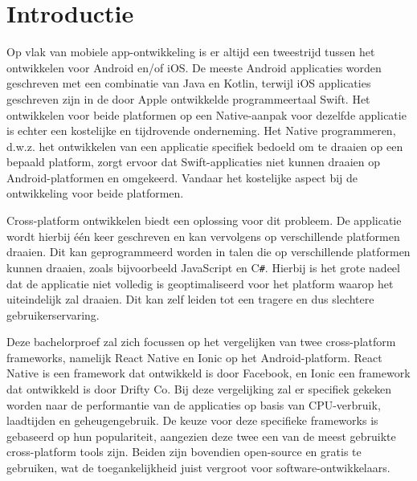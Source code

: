 
\section{Introductie}%
\label{sec:introductie}

Op vlak van mobiele app-ontwikkeling is er altijd een tweestrijd tussen het ontwikkelen voor Android en/of iOS. De meeste Android applicaties worden geschreven met een combinatie van Java en Kotlin, terwijl iOS applicaties geschreven zijn in de door Apple ontwikkelde programmeertaal Swift. Het ontwikkelen voor beide platformen op een Native-aanpak voor dezelfde applicatie is echter een kostelijke en tijdrovende onderneming. Het Native programmeren, d.w.z. het ontwikkelen van een applicatie specifiek bedoeld om te draaien op een bepaald platform, zorgt ervoor dat Swift-applicaties niet kunnen draaien op Android-platformen en omgekeerd. Vandaar het kostelijke aspect bij de ontwikkeling voor beide platformen.

Cross-platform ontwikkelen biedt een oplossing voor dit probleem. De applicatie wordt hierbij één keer geschreven en kan vervolgens op verschillende platformen draaien. Dit kan geprogrammeerd worden in talen die op verschillende platformen kunnen draaien, zoals bijvoorbeeld JavaScript en C\verb*|#|. Hierbij is het grote nadeel dat de applicatie niet volledig is geoptimaliseerd voor het platform waarop het uiteindelijk zal draaien. Dit kan zelf leiden tot een tragere en dus slechtere gebruikerservaring.

Deze bachelorproef zal zich focussen op het vergelijken van twee cross-platform frameworks, namelijk React Native en Ionic op het Android-platform. React Native is een framework dat ontwikkeld is door Facebook, en Ionic een framework dat ontwikkeld is door Drifty Co. Bij deze vergelijking zal er specifiek gekeken worden naar de performantie van de applicaties op basis van CPU-verbruik, laadtijden en geheugengebruik. De keuze voor deze specifieke frameworks is gebaseerd op hun populariteit, aangezien deze twee een van de meest gebruikte cross-platform tools zijn. Beiden zijn bovendien open-source en gratis te gebruiken, wat de toegankelijkheid juist vergroot voor software-ontwikkelaars.

